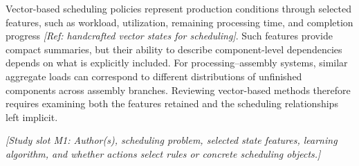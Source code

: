 
Vector-based scheduling policies represent production conditions through selected features,
such as workload, utilization, remaining processing time, and completion progress \textit{[Ref:
handcrafted vector states for scheduling]}. Such features provide compact summaries,
but their ability to describe component-level dependencies depends on what is explicitly included.
For processing--assembly systems, similar aggregate loads can correspond to different distributions
of unfinished components across assembly branches. Reviewing vector-based methods therefore requires
examining both the features retained and the scheduling relationships left implicit.


\textit{[Study slot M1: Author(s), scheduling problem, selected state features, learning algorithm,
and whether actions select rules or concrete scheduling objects.]}

